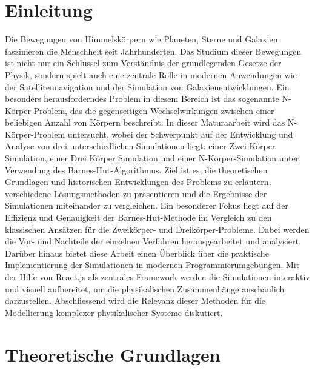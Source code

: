 \documentclass[a4paper,12pt,twoside]{article}
\begin{document}

\newpage
\tableofcontents

\parindent=0pt
\parskip=6pt

\newpage




\section{Einleitung}
Die Bewegungen von Himmelskörpern wie Planeten, Sterne und Galaxien faszinieren 
die Menschheit seit Jahrhunderten. Das Studium dieser Bewegungen ist nicht nur 
ein Schlüssel zum Verständnis der grundlegenden Gesetze der Physik, sondern spielt 
auch eine zentrale Rolle in modernen Anwendungen wie der Satellitennavigation 
und der Simulation von Galaxienentwicklungen. Ein besonders herausforderndes 
Problem in diesem Bereich ist das sogenannte N-Körper-Problem, das die 
gegenseitigen Wechselwirkungen zwischen einer beliebigen Anzahl von Körpern beschreibt.
In dieser Maturaarbeit wird das N-Körper-Problem untersucht, wobei der Schwerpunkt 
auf der Entwicklung und Analyse von drei unterschiedlichen Simulationen liegt: 
einer Zwei Körper Simulation, einer Drei Körper Simulation und einer N-Körper-Simulation 
unter Verwendung des Barnes-Hut-Algorithmus. Ziel ist es, die theoretischen Grundlagen 
und historischen Entwicklungen des Problems zu erläutern, verschiedene Lösungsmethoden 
zu präsentieren und die Ergebnisse der Simulationen miteinander zu vergleichen.
Ein besonderer Fokus liegt auf der Effizienz und Genauigkeit der Barnes-Hut-Methode 
im Vergleich zu den klassischen Ansätzen für die Zweikörper- und Dreikörper-Probleme. 
Dabei werden die Vor- und Nachteile der einzelnen Verfahren herausgearbeitet und analysiert.
Darüber hinaus bietet diese Arbeit einen Überblick über die praktische Implementierung der 
Simulationen in modernen Programmierumgebungen. Mit der Hilfe von React.js als zentrales 
Framework werden die Simulationen interaktiv und visuell aufbereitet, um die physikalischen Zusammenhänge anschaulich darzustellen.
Abschliessend wird die Relevanz dieser Methoden für die Modellierung komplexer physikalischer Systeme diskutiert.
\newpage


\section{Theoretische Grundlagen}
\end{document}
